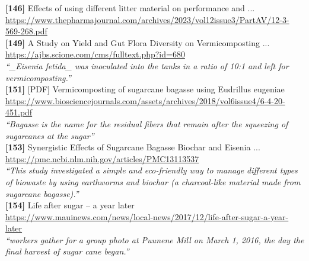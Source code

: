 \textbf{[146]} Effects of using different litter material on performance and ...\\[0.15em]
\url{https://www.thepharmajournal.com/archives/2023/vol12issue3/PartAV/12-3-569-268.pdf}\\[0.2em]

\textbf{[149]} A Study on Yield and Gut Flora Diversity on Vermicomposting ...\\[0.15em]
\url{https://ajbs.scione.com/cms/fulltext.php?id=680}\\[0.2em]
\emph{``\_Eisenia fetida\_ was inoculated into the tanks in a ratio of 10:1 and left for vermicomposting.''}\\[0.45em]

\textbf{[151]} [PDF] Vermicomposting of sugarcane bagasse using Eudrillus eugeniae\\[0.15em]
\url{https://www.biosciencejournals.com/assets/archives/2018/vol6issue4/6-4-20-451.pdf}\\[0.2em]
\emph{``Bagasse is the name for the residual fibers that remain after the squeezing of sugarcanes at the sugar''}\\[0.45em]

\textbf{[153]} Synergistic Effects of Sugarcane Bagasse Biochar and Eisenia ...\\[0.15em]
\url{https://pmc.ncbi.nlm.nih.gov/articles/PMC13113537}\\[0.2em]
\emph{``This study investigated a simple and eco-friendly way to manage different types of biowaste by using earthworms and biochar (a charcoal-like material made from sugarcane bagasse).''}\\[0.45em]

\textbf{[154]} Life after sugar – a year later\\[0.15em]
\url{https://www.mauinews.com/news/local-news/2017/12/life-after-sugar-a-year-later}\\[0.2em]
\emph{``workers gather for a group photo at Puunene Mill on March 1, 2016, the day the final harvest of sugar cane began.''}\\[0.45em]
